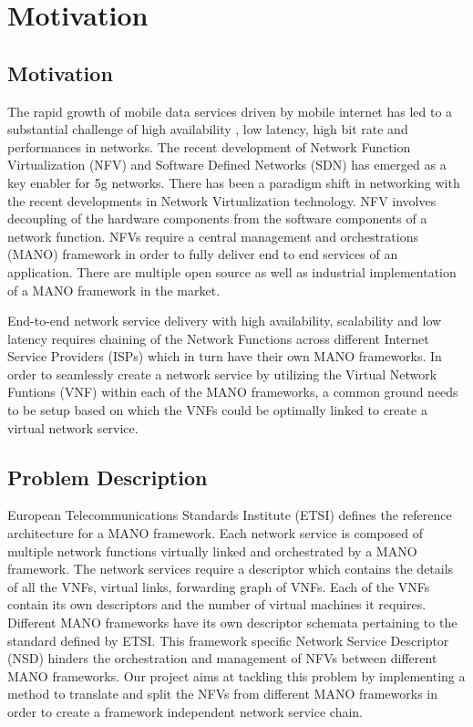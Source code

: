 \chapter{Motivation}
\label{ch:Motivation}

\section{Motivation}

The rapid growth of mobile data services driven by mobile internet has led to a substantial challenge of high availability , low latency, high bit rate and performances in networks. The recent development of Network Function Virtualization (NFV) and Software Defined Networks (SDN) has emerged as a key enabler for 5g networks. 
There has been a paradigm shift in networking with the recent developments in Network Virtualization technology. NFV involves decoupling of the hardware components from the software components of a network function. NFVs require a central management and orchestrations (MANO) framework  in order to fully deliver end to end services of an application. There are multiple open source as well as industrial implementation of a  MANO framework in the market. 

End-to-end network service delivery with high availability, scalability and low latency requires chaining of the Network Functions across different Internet Service Providers (ISPs) which in turn have their own MANO frameworks. In order to seamlessly create a network service by utilizing the Virtual Network Funtions (VNF) within each of the MANO frameworks, a common ground needs to be setup based on which the VNFs could be optimally linked to create a virtual network service.


\section{Problem Description}

European Telecommunications Standards Institute (ETSI) defines the reference architecture for a MANO framework. Each network service is composed of multiple network functions virtually linked and orchestrated by a MANO framework. The network services require a descriptor which contains the details of all the VNFs, virtual links, forwarding graph of VNFs. Each of the VNFs contain its own descriptors and the number of virtual machines it requires. Different MANO frameworks have its own descriptor schemata pertaining to the standard defined by ETSI. This framework specific Network Service Descriptor (NSD) hinders the orchestration and management of NFVs between different MANO frameworks. Our project aims at tackling this problem by implementing a method to translate and split the NFVs from different MANO frameworks in order to create a framework independent network service chain.

